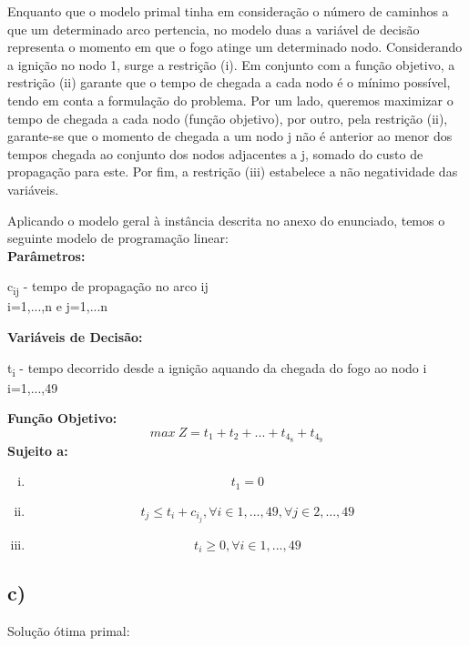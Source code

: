 \documentclass[11pt]{article} %
\begin{document}
Enquanto que o modelo primal tinha em consideração o número de caminhos a que um determinado arco pertencia, no modelo duas a variável de decisão representa o momento em que o fogo atinge um determinado nodo. Considerando a ignição no nodo 1, surge a restrição (i). Em conjunto com a função objetivo, a restrição (ii) garante que o tempo de chegada a cada nodo é o mínimo possível, tendo em conta a formulação do problema. Por um lado, queremos maximizar o tempo de chegada a cada nodo (função objetivo), por outro, pela restrição (ii), garante-se que o momento de chegada a um nodo j não é anterior ao menor dos tempos chegada ao conjunto dos nodos adjacentes a j, somado do custo de propagação para este. Por fim, a restrição (iii) estabelece a não negatividade das variáveis.

Aplicando o modelo geral à instância descrita no anexo do enunciado, temos o seguinte modelo de programação linear: \\
\textbf{Parâmetros:}  \\

\begin{center}
c\textsubscript{ij} - tempo de propagação no arco ij\\
i=1,...,n e j=1,...n \\
\end{center}
\textbf{Variáveis de Decisão:} \\
\begin{center}
t\textsubscript{i} - tempo decorrido desde a ignição aquando da chegada do fogo ao nodo i\\
i=1,...,49\\
\end{center}
\textbf{Função Objetivo:} \\
$$max \ Z = t_1+t_2+...+t_4_8+t_4_9$$
\textbf{Sujeito a:}
\begin{enumerate}[(i)]
\item $$t_1 = 0$$
\item $$t_j \leq t_i + c_i_j, \forall i \in 1,...,49 , \forall j \in 2,...,49$$
\item $$t_i \geq 0, \forall i \in 1,...,49$$
\end{enumerate}


\newpage

\subsection*{c)}
Solução ótima primal:
\end{document}
